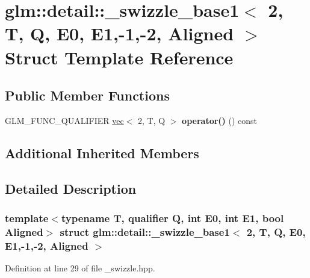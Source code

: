 \hypertarget{structglm_1_1detail_1_1__swizzle__base1_3_012_00_01T_00_01Q_00_01E0_00_01E1_00-1_00-2_00_01Aligned_01_4}{}\section{glm\+:\+:detail\+:\+:\+\_\+swizzle\+\_\+base1$<$ 2, T, Q, E0, E1,-\/1,-\/2, Aligned $>$ Struct Template Reference}
\label{structglm_1_1detail_1_1__swizzle__base1_3_012_00_01T_00_01Q_00_01E0_00_01E1_00-1_00-2_00_01Aligned_01_4}
\subsection*{Public Member Functions}
\begin{DoxyCompactItemize}
\item 
\mbox{\label{structglm_1_1detail_1_1__swizzle__base1_3_012_00_01T_00_01Q_00_01E0_00_01E1_00-1_00-2_00_01Aligned_01_4_ae4bac86c7894c7c68590818deb920945}} 
G\+L\+M\+\_\+\+F\+U\+N\+C\+\_\+\+Q\+U\+A\+L\+I\+F\+I\+ER \hyperlink{structglm_1_1vec}{vec}$<$ 2, T, Q $>$ {\bfseries operator()} () const
\end{DoxyCompactItemize}
\subsection*{Additional Inherited Members}


\subsection{Detailed Description}
\subsubsection*{template$<$typename T, qualifier Q, int E0, int E1, bool Aligned$>$\newline
struct glm\+::detail\+::\+\_\+swizzle\+\_\+base1$<$ 2, T, Q, E0, E1,-\/1,-\/2, Aligned $>$}



Definition at line 29 of file \+\_\+swizzle.\+hpp.



